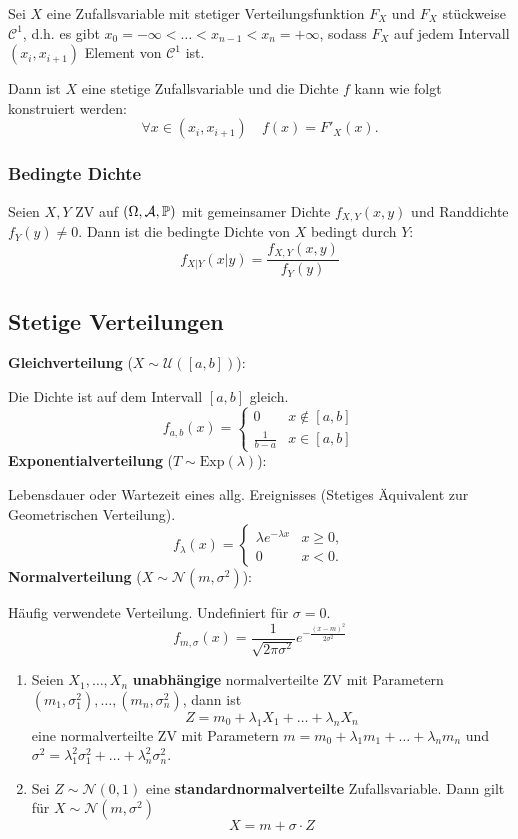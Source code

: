 Sei $X$ eine Zufallsvariable mit stetiger Verteilungsfunktion $F_X$ und $F_X$ stückweise $\mathcal{C}^1$, d.h. es gibt $x_0 = - \infty < \ldots < x_{n-1} < x_n = +\infty$, sodass $F_X$ auf jedem Intervall $(x_i, x_{i+1})$ Element von $\mathcal{C}^1$ ist. 

Dann ist $X$ eine stetige Zufallsvariable und die Dichte $f$ kann wie folgt konstruiert werden:
$$\forall x \in (x_i, x_{i+1}) \quad f(x) = F'_X(x).$$

\subsubsection*{Bedingte Dichte}
Seien $X,Y$ ZV auf $(\Omega, \mathcal{A}, \mathbb{P})$ mit gemeinsamer Dichte $f_{X,Y}(x, y)$ und Randdichte $f_{Y}(y) \neq 0$.
Dann ist die bedingte Dichte von $X$ bedingt durch $Y$:
$$f_{X | Y}(x|y) = \frac{f_{X,Y}(x,y)}{f_Y(y)}$$

\subsection{Stetige Verteilungen}
\textbf{Gleichverteilung} ($X \sim \mathcal{U}([a,b])$): 

Die Dichte ist auf dem Intervall $[a, b]$ gleich. 
$$f_{a,b}(x) = \begin{cases}
    0 & x \notin [a,b]\\
    \frac{1}{b-a} & x \in [a,b]
\end{cases}$$
\textbf{Exponentialverteilung} ($T \sim \text{Exp}(\lambda)$): 

Lebensdauer oder Wartezeit eines allg. Ereignisses (Stetiges Äquivalent zur Geometrischen Verteilung).
$$f_\lambda(x) = \begin{cases}
    \lambda e^{-\lambda x} & x \ge 0,\\
    0 & x < 0.
\end{cases}$$ 
\textbf{Normalverteilung} ($X \sim \mathcal{N}(m, \sigma^2)$): 

Häufig verwendete Verteilung. Undefiniert für $\sigma = 0$.
$$f_{m, \sigma}(x) = \frac{1}{\sqrt{2\pi\sigma^2}}e^{-\frac{(x-m)^2}{2\sigma^2}}$$
\begin{enumerate}
    \item Seien $X_1, \ldots, X_n$ \textbf{unabhängige} normalverteilte ZV mit Parametern $(m_1,\sigma_1^2), \ldots, (m_n, \sigma_n^2)$, dann ist 
    $$Z = m_0 + \lambda_1 X_1 + \ldots + \lambda_n X_n$$
    eine normalverteilte ZV mit Parametern $m = m_0 + \lambda_1 m_1 + \ldots + \lambda_n m_n$ und $\sigma^2 = \lambda_1^2 \sigma_1^2 + \ldots + \lambda_n^2 \sigma_n^2$.
    \item Sei $Z \sim \mathcal{N}(0,1)$ eine \textbf{standardnormalverteilte} Zufallsvariable. Dann gilt für $X \sim \mathcal{N}(m, \sigma^2)$ 
    $$X = m + \sigma \cdot Z$$   
\end{enumerate}


